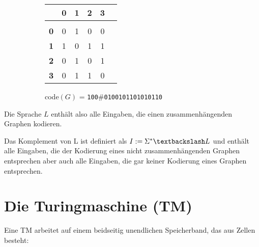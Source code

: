 \documentclass{scrartcl}%
\begin{document}
    \begin{figure}[H]
        \centering
        \begin{subfigure}{.5\textwidth}
            \centering
        \end{subfigure}%
        \begin{subfigure}{.5\textwidth}
            \begin{table}[H]
                \centering
                \small
                \begin{tabular}{r|ccccc}
                    & \textbf{\textsf{0}} & \textbf{\textsf{1}} & \textbf{\textsf{2}} & \textbf{\textsf{3}} \\
                    \hline \\ [-2ex]
                    \textbf{\textsf{0}} & 0 & 1 & 0 & 0 \\
                    \textbf{\textsf{1}} & 1 & 0 & 1 & 1 \\
                    \textbf{\textsf{2}} & 0 & 1 & 0 & 1 \\
                    \textbf{\textsf{3}} & 0 & 1 & 1 & 0
                \end{tabular}
            \end{table}
            code$(G)$ = \texttt{100}\#\texttt{0100101101010110}
        \end{subfigure}
    \end{figure}

    Die Sprache $L$ enthält also alle Eingaben, die einen zusammenhängenden Graphen kodieren.

    \vspace*{0.3cm}
    Das Komplement von L ist definiert als $I:= \Sigma^* \textbackslash L$ und enthält alle Eingaben,
    die der Kodierung eines nicht zusammenhängenden Graphen entsprechen aber auch alle Eingaben,
    die gar keiner Kodierung eines Graphen entsprechen.

    \newpage
    \section*{Die Turingmaschine (TM)}\label{sec:dieTuringmaschinetm}
    Eine TM arbeitet auf einem beidseitig unendlichen Speicherband, das aus Zellen besteht:
\end{document}
